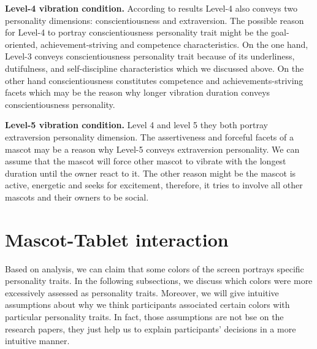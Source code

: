 \par \textbf{Level-4 vibration condition.} According to results Level-4 also conveys two personality dimensions: conscientiousness and extraversion. The possible reason for Level-4 to portray conscientiousness personality trait might be the goal-oriented, achievement-striving and competence characteristics. On the one hand, Level-3 conveys conscientiousness personality trait because of its underliness, dutifulness, and self-discipline characteristics which we discussed above. On the other hand conscientiousness constitutes competence and achievements-striving facets which may be the reason why longer vibration duration conveys conscientiousness personality.
\par \textbf{Level-5 vibration condition.} Level 4 and level 5 they both portray extraversion personality dimension. The assertiveness and forceful facets of a mascot may be a reason why Level-5 conveys extraversion personality. We can assume that the mascot will force other mascot to vibrate with the longest duration until the owner react to it. The other reason might be the mascot is active, energetic and seeks for excitement, therefore, it tries to involve all other mascots and their owners to be social.

\section{Mascot-Tablet interaction}
Based on analysis, we can claim that some colors of the screen portrays specific personality traits. In the following subsections, we discuss which colors were more excessively assessed as personality traits. Moreover, we will give intuitive assumptions about why we think participants associated certain colors with particular personality traits. In fact, those assumptions are not bse on the research papers, they just help us to explain participants’ decisions in a more intuitive manner.


